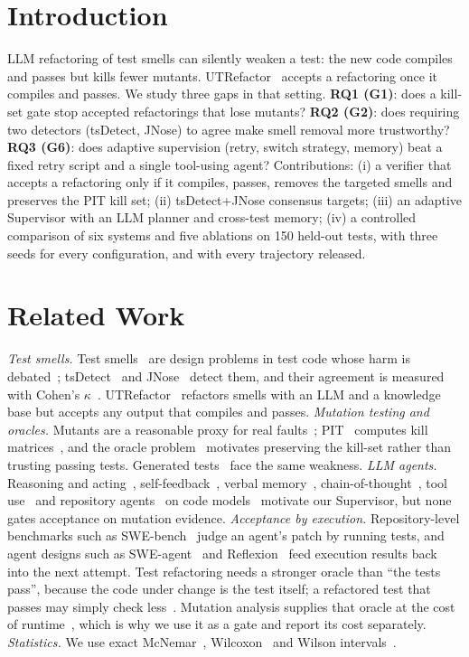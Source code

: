 \documentclass[conference]{IEEEtran}
\begin{document}
\section{Introduction}
LLM refactoring of test smells can silently weaken a test: the new code compiles and passes but kills fewer
mutants. UTRefactor~\cite{utrefactor} accepts a refactoring once it compiles and passes. We study three gaps in that setting.
\textbf{RQ1 (G1)}: does a kill-set gate stop accepted refactorings that lose mutants?
\textbf{RQ2 (G2)}: does requiring two detectors (tsDetect, JNose) to agree make smell removal more trustworthy?
\textbf{RQ3 (G6)}: does adaptive supervision (retry, switch strategy, memory) beat a fixed retry script and a single tool-using agent?
Contributions: (i) a verifier that accepts a refactoring only if it compiles, passes, removes the targeted smells and preserves the PIT kill set;
(ii) tsDetect+JNose consensus targets; (iii) an adaptive Supervisor with an LLM planner and cross-test memory;
(iv) a controlled comparison of six systems and five ablations on 150 held-out tests, with three seeds for every configuration, and with every trajectory released.

\section{Related Work}
\emph{Test smells.} Test smells~\cite{garousi2018,tufano2016} are design problems in test code whose harm is debated~\cite{bavota2015}; tsDetect~\cite{peruma2020} and JNose~\cite{virginio2020} detect them, and their agreement is measured with Cohen's $\kappa$~\cite{cohen1960,landis1977}.
UTRefactor~\cite{utrefactor} refactors smells with an LLM and a knowledge base but accepts any output that compiles and passes.
\emph{Mutation testing and oracles.} Mutants are a reasonable proxy for real faults~\cite{just2014}; PIT~\cite{coles2016} computes kill matrices~\cite{jia2011,papadakis2019}, and the oracle problem~\cite{barr2015} motivates preserving the kill-set rather than trusting passing tests. Generated tests~\cite{fraser2011,schafer2024} face the same weakness.
\emph{LLM agents.} Reasoning and acting~\cite{yao2023}, self-feedback~\cite{madaan2023}, verbal memory~\cite{shinn2023}, chain-of-thought~\cite{wei2022}, tool use~\cite{schick2023} and repository agents~\cite{jimenez2024,yang2024} on code models~\cite{chen2021} motivate our Supervisor, but none gates acceptance on mutation evidence.
\emph{Acceptance by execution.} Repository-level benchmarks such as SWE-bench~\cite{jimenez2024} judge an agent's patch by running tests, and agent designs such as SWE-agent~\cite{yang2024} and Reflexion~\cite{shinn2023} feed execution results back into the next attempt. Test refactoring needs a stronger oracle than ``the tests pass'', because the code under change is the test itself; a refactored test that passes may simply check less~\cite{barr2015}. Mutation analysis supplies that oracle at the cost of runtime~\cite{jia2011,papadakis2019}, which is why we use it as a gate and report its cost separately.
\emph{Statistics.} We use exact McNemar~\cite{mcnemar1947}, Wilcoxon~\cite{wilcoxon1945} and Wilson intervals~\cite{wilson1927}.
\end{document}
